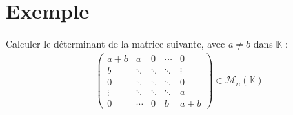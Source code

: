 \documentclass[../main.tex]{subfiles}
\begin{document}
\section{Exemple}
\begin{tcolorbox}[title=Exemple 30.64, title filled=false, colframe=darkgreen, colback=darkgreen!10!white]
    Calculer le déterminant de la matrice suivante, avec $a\neq b$ dans $\mathbb{K}$ : 
    \begin{align*}
        \begin{pmatrix}
            a+b & a & 0 & \cdots & 0 \\
            b & \ddots & \ddots & \ddots & \vdots \\
            0 & \ddots & \ddots & \ddots & 0 \\
            \vdots & \ddots & \ddots & \ddots & a \\
            0 & \cdots & 0 & b & a+b
        \end{pmatrix}\in \mathcal{M}_n(\mathbb{K})
    \end{align*}
\end{tcolorbox}
\end{document}
